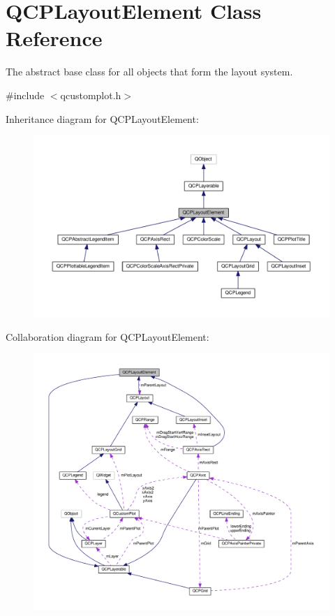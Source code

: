 \hypertarget{classQCPLayoutElement}{}\section{Q\+C\+P\+Layout\+Element Class Reference}
\label{classQCPLayoutElement}


The abstract base class for all objects that form the layout system.  




{\ttfamily \#include $<$qcustomplot.\+h$>$}



Inheritance diagram for Q\+C\+P\+Layout\+Element\+:\nopagebreak
\begin{figure}[H]
\begin{center}
\leavevmode
\includegraphics[width=350pt]{classQCPLayoutElement__inherit__graph}
\end{center}
\end{figure}


Collaboration diagram for Q\+C\+P\+Layout\+Element\+:\nopagebreak
\begin{figure}[H]
\begin{center}
\leavevmode
\includegraphics[width=350pt]{classQCPLayoutElement__coll__graph}
\end{center}
\end{figure}
